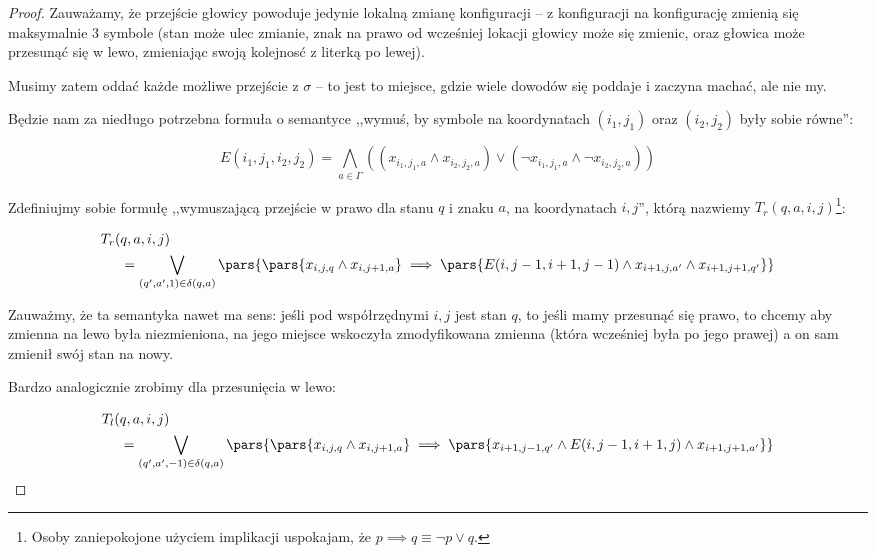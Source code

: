 \begin{proof}
        Zauważamy, że przejście głowicy powoduje jedynie lokalną zmianę konfiguracji -- z konfiguracji na konfigurację zmienią się maksymalnie 3 symbole (stan może ulec zmianie, znak na prawo od wcześniej lokacji głowicy może się zmienic, oraz głowica może przesunąć się w lewo, zmieniając swoją kolejnosć z literką po lewej).

        Musimy zatem oddać każde możliwe przejście z \( \sigma \) -- to jest to miejsce, gdzie wiele dowodów się poddaje i zaczyna machać, ale nie my. 
        
        Będzie nam za niedługo potrzebna formuła o semantyce ,,wymuś, by symbole na koordynatach \( (i_1, j_1) \) oraz \((i_2, j_2)\) były sobie równe'':
        
        \[ 
            E(i_1, j_1, i_2, j_2) = \bigwedge_{a \in \Gamma} ((x_{i_1, j_1, a} \land x_{i_2, j_2, a}) \lor (\neg x_{i_1, j_1, a} \land \neg x_{i_2, j_2, a}) )
        \]
        
        Zdefiniujmy sobie formułę ,,wymuszającą przejście w prawo dla stanu \(q\) i znaku \(a\), na koordynatach \(i, j\)'', którą nazwiemy \(T_r(q, a, i, j)\)\footnote{Osoby zaniepokojone użyciem implikacji uspokajam, że \(p \implies q \equiv \neg p \lor q\).}:
        
        \[
            \begin{split}
            T_r(&q,a, i, j)\\
                &= \bigvee_{(q', a', 1) \in \delta(q,a)} \pars{\pars{x_{i,j,q} \land x_{i, j + 1, a}} \implies \pars{E(i, j-1, i+1, j-1) \land x_{i+1, j, a'} \land x_{i+1, j+1, q'}}}
            \end{split}
        \]
        
        Zauważmy, że ta semantyka nawet ma sens: jeśli pod współrzędnymi \(i,j\) jest stan \(q\), to jeśli mamy przesunąć się prawo, to chcemy aby zmienna na lewo była niezmieniona, na jego miejsce wskoczyła zmodyfikowana zmienna (która wcześniej była po jego prawej) a on sam zmienił swój stan na nowy. 
        
        Bardzo analogicznie zrobimy dla przesunięcia w lewo:
        
        \[
            \begin{split}
                T_l(&q, a , i, j)\\
                    &= \bigvee_{(q', a', -1) \in \delta(q,a)} \pars{\pars{x_{i,j,q} \land x_{i, j + 1, a}} \implies \pars{x_{i+1, j-1, q'} \land E(i, j-1, i+1, j) \land x_{i + 1,j + 1,a'}}}
            \end{split}
        \]
    

\end{proof}

